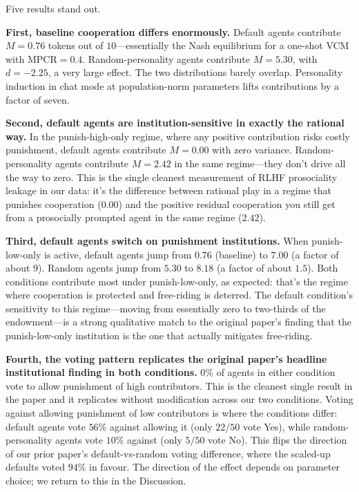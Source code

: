 \documentclass[12pt, a4paper]{article}
\begin{document}
Five results stand out.

\textbf{First, baseline cooperation differs enormously.} Default agents contribute $M=0.76$ tokens out of $10$---essentially the Nash equilibrium for a one-shot VCM with $\mathrm{MPCR}=0.4$. Random-personality agents contribute $M=5.30$, with $d=-2.25$, a very large effect. The two distributions barely overlap. Personality induction in chat mode at population-norm parameters lifts contributions by a factor of seven.

\textbf{Second, default agents are institution-sensitive in exactly the rational way.} In the punish-high-only regime, where any positive contribution risks costly punishment, default agents contribute $M=0.00$ with zero variance. Random-personality agents contribute $M=2.42$ in the same regime---they don't drive all the way to zero. This is the single cleanest measurement of RLHF prosociality leakage in our data: it's the difference between rational play in a regime that punishes cooperation ($0.00$) and the positive residual cooperation you still get from a prosocially prompted agent in the same regime ($2.42$).

\textbf{Third, default agents switch on punishment institutions.} When punish-low-only is active, default agents jump from $0.76$ (baseline) to $7.00$ (a factor of about $9$). Random agents jump from $5.30$ to $8.18$ (a factor of about $1.5$). Both conditions contribute most under punish-low-only, as expected: that's the regime where cooperation is protected and free-riding is deterred. The default condition's sensitivity to this regime---moving from essentially zero to two-thirds of the endowment---is a strong qualitative match to the original paper's finding that the punish-low-only institution is the one that actually mitigates free-riding.

\textbf{Fourth, the voting pattern replicates the original paper's headline institutional finding in both conditions.} $0\%$ of agents in either condition vote to allow punishment of high contributors. This is the cleanest single result in the paper and it replicates without modification across our two conditions. Voting against allowing punishment of low contributors is where the conditions differ: default agents vote $56\%$ against allowing it (only $22/50$ vote Yes), while random-personality agents vote $10\%$ against (only $5/50$ vote No). This flips the direction of our prior paper's default-vs-random voting difference, where the scaled-up defaults voted $94\%$ in favour. The direction of the effect depends on parameter choice; we return to this in the Discussion.
\end{document}
